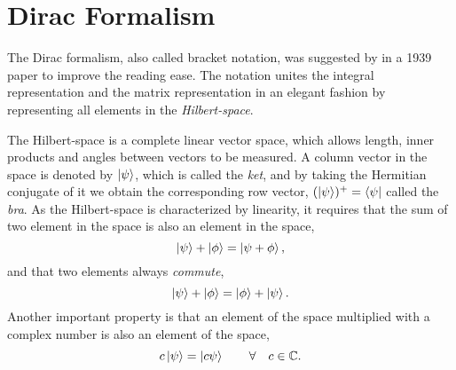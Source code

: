 \chapter{Dirac Formalism} \label{app:dirac}
The Dirac formalism, also called bracket notation, was suggested by \citet{dirac_new_1939} in a 1939 paper to improve the reading ease. The notation unites the integral representation and the matrix representation in an elegant fashion by representing all elements in the \textit{Hilbert-space}. 

The Hilbert-space is a complete linear vector space, which allows length, inner products and angles between vectors to be measured. A column vector in the space is denoted by $\ket{\psi}$, which is called the \textit{ket}, and by taking the Hermitian conjugate of it we obtain the corresponding row vector, $(\ket{\psi})^+=\bra{\psi}$ called the \textit{bra}. As the Hilbert-space is characterized by linearity, it requires that the sum of two element in the space is also an element in the space,
\begin{equation}
\ket{\psi}+\ket{\phi}=\ket{\psi+\phi},
\end{equation}
and that two elements always \textit{commute},
\begin{equation}
\ket{\psi}+\ket{\phi}=\ket{\phi}+\ket{\psi}.
\end{equation}
Another important property is that an element of the space multiplied with a complex number is also an element of the space,
\begin{equation}
c\ket{\psi}=\ket{c\psi}\quad\quad\forall\quad c\in\mathbb{C}.
\end{equation}

